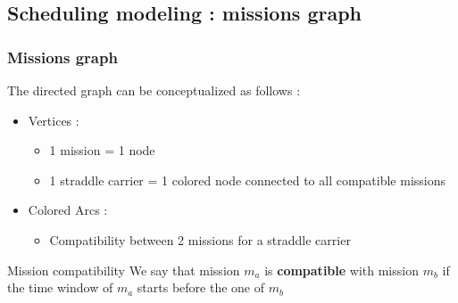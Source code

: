 \documentclass{beamer}
\begin{document}
\subsection*{Scheduling modeling : missions graph}
\begin{frame}
\frametitle{Missions graph}
	The directed graph can be conceptualized as follows :
		\begin{itemize}
	 		\item Vertices : 
				\begin{itemize}
 					\item 1 mission = 1 node
					\item 1 straddle carrier = 1 colored node connected to all compatible missions
				\end{itemize}
 
			\item Colored Arcs :
				\begin{itemize}
					\item Compatibility between 2 missions for a straddle carrier
				\end{itemize}
		\end{itemize}


	\begin{block}{Mission compatibility}
		We say that mission $m_a$ is \textbf{compatible} with mission $m_b$ if the time window of $m_a$ starts before the one of $m_b$
	\end{block}

\end{frame}
\end{document}
